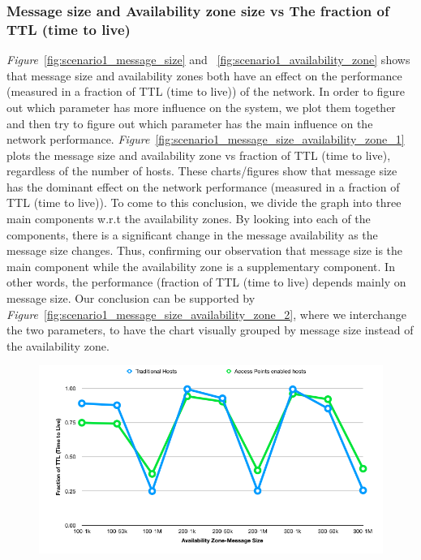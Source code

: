 {\subsubsection{Message size and Availability zone size vs The fraction of TTL (time to live)}
\emph{Figure}~\ref{fig:scenario1_message_size} and ~\ref{fig:scenario1_availability_zone} shows that message size and availability zones both have an effect on the performance (measured in a fraction of TTL (time to live)) of the network. In order to figure out which parameter has more influence on the system, we plot them together and then try to figure out which parameter has the main influence on the network performance.
\emph{Figure}~\ref{fig:scenario1_message_size_availability_zone_1} plots the message size and availability zone vs fraction of TTL (time to live), regardless of the number of hosts. These charts/figures show that message size has the dominant effect on the network performance (measured in a fraction of TTL (time to live)). To come to this conclusion, we divide the graph into three main components w.r.t the availability zones. By looking into each of the components, there is a significant change in the message availability as the message size changes. Thus, confirming our observation that message size is the main component while the availability zone is a supplementary component. In other words, the performance (fraction of TTL (time to live) depends mainly on message size.\newline
Our conclusion can be supported by \emph{Figure}~\ref{fig:scenario1_message_size_availability_zone_2}, where we interchange the two parameters, to have the chart visually grouped by message size instead of the availability zone.
\begin{figure}[H]
  \centering
  \includegraphics[scale=0.55]{./figures/scenario1_message_size_availability_zone_1}

\end{figure}}
